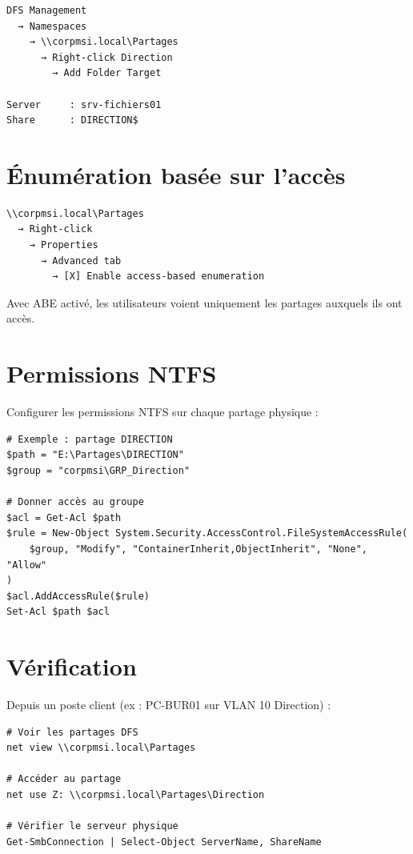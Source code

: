 \begin{lstlisting}
DFS Management
  → Namespaces
    → \\corpmsi.local\Partages
      → Right-click Direction
        → Add Folder Target

Server     : srv-fichiers01
Share      : DIRECTION$
\end{lstlisting}

\section{Énumération basée sur l'accès}

\begin{lstlisting}
\\corpmsi.local\Partages
  → Right-click
    → Properties
      → Advanced tab
        → [X] Enable access-based enumeration
\end{lstlisting}

Avec ABE activé, les utilisateurs voient uniquement les partages auxquels ils ont accès.

\section{Permissions NTFS}

Configurer les permissions NTFS sur chaque partage physique :

\begin{lstlisting}[style=powershell]
# Exemple : partage DIRECTION
$path = "E:\Partages\DIRECTION"
$group = "corpmsi\GRP_Direction"

# Donner accès au groupe
$acl = Get-Acl $path
$rule = New-Object System.Security.AccessControl.FileSystemAccessRule(
    $group, "Modify", "ContainerInherit,ObjectInherit", "None", "Allow"
)
$acl.AddAccessRule($rule)
Set-Acl $path $acl
\end{lstlisting}

\section{Vérification}

Depuis un poste client (ex : PC-BUR01 sur VLAN 10 Direction) :

\begin{lstlisting}[style=powershell]
# Voir les partages DFS
net view \\corpmsi.local\Partages

# Accéder au partage
net use Z: \\corpmsi.local\Partages\Direction

# Vérifier le serveur physique
Get-SmbConnection | Select-Object ServerName, ShareName
\end{lstlisting}

